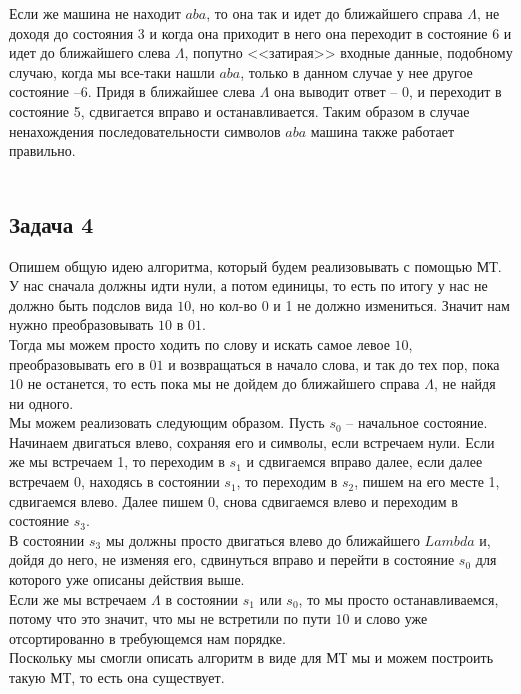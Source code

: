 	Если же машина не находит $aba$, то она так и идет до ближайшего справа $\Lambda$, не доходя до состояния 3 и когда она приходит в него она переходит в состояние 6 и идет до ближайшего слева $\Lambda$, попутно <<затирая>> входные данные, подобному случаю, когда мы все-таки нашли $aba$, только в данном случае у нее другое состояние --6. Придя в ближайшее слева $\Lambda$ она выводит ответ -- 0, и переходит в состояние 5, сдвигается вправо и останавливается. Таким образом в случае ненахождения последовательности символов $aba$ машина также работает правильно. \\\\
	
	\subsection{Задача 4}
	Опишем общую идею алгоритма, который будем реализовывать с помощью МТ. \\
	У нас сначала должны идти нули, а потом единицы, то есть по итогу у нас не должно быть подслов вида $10$, но кол-во 0 и 1 не должно измениться. Значит нам нужно преобразовывать $10$ в $01$. \\
	Тогда мы можем просто ходить по слову и искать самое левое $10$, преобразовывать его в $01$ и возвращаться в начало слова, и так до тех пор, пока $10$ не останется, то есть пока мы не дойдем до ближайшего справа $\Lambda$, не найдя ни одного. \\
	Мы можем реализовать следующим образом. Пусть $s_0$ -- начальное состояние. Начинаем двигаться влево, сохраняя его и символы, если встречаем нули. 
	Если же мы встречаем 1, то переходим в $s_1$ и сдвигаемся вправо далее, если далее встречаем 0, находясь в состоянии $s_1$, то переходим в $s_2$, пишем на его месте 1, сдвигаемся влево. Далее пишем 0, снова сдвигаемся влево и переходим в состояние $s_3$. \\
	В состоянии $s_3$ мы должны просто двигаться влево до ближайшего $Lambda$ и, дойдя до него, не изменяя его, сдвинуться вправо и перейти в состояние $s_0$ для которого уже описаны действия выше. \\
	Если же мы встречаем $\Lambda$ в состоянии $s_1$ или $s_0$, то мы просто останавливаемся, потому что это значит, что мы не встретили по пути $10$ и слово уже отсортированно в требующемся нам порядке.\\
	Поскольку мы смогли описать алгоритм в виде для МТ мы и можем построить такую МТ, то есть она существует. 
	

